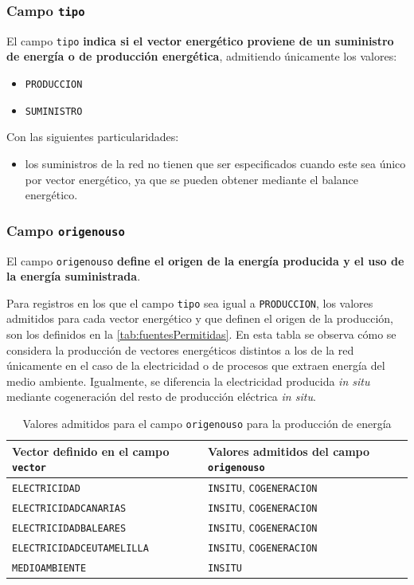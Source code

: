 \documentclass[10pt,notitlepage,oneside,a4paper]{article}
\begin{document}
\subsubsection{Campo \texttt{tipo}}

El campo \texttt{tipo} \textbf{indica si el vector energético proviene de un suministro de energía o de producción energética}, admitiendo únicamente los valores:

\begin{itemize}
\item \texttt{PRODUCCION}
\item \texttt{SUMINISTRO}
\end{itemize}

Con las siguientes particularidades:

\begin{itemize}
\item los suministros de la red no tienen que ser especificados cuando este sea único por vector energético, ya que se pueden obtener mediante el balance energético.
\end{itemize}

\subsubsection{Campo \texttt{origenouso}}

El campo \texttt{origenouso} \textbf{define el origen de la energía producida y el uso de la energía suministrada}.

Para registros en los que el campo \texttt{tipo} sea igual a \texttt{PRODUCCION}, los valores admitidos para cada vector energético y que definen el origen de la producción, son los definidos en la \autoref{tab:fuentesPermitidas}. En esta tabla se observa cómo se considera la producción de vectores energéticos distintos a los de la red únicamente en el caso de la electricidad o de procesos que extraen energía del medio ambiente. Igualmente, se diferencia la electricidad producida \textit{in situ} mediante cogeneración del resto de producción eléctrica \textit{in situ}.

\begin{table}[H]
\centering
\small
\caption{Valores admitidos para el campo \texttt{origenouso} para la producción de energía}\label{tab:fuentesPermitidas}
\begin{tabular}{ll}
    \toprule
    \textbf{Vector definido en el campo \texttt{vector}} & \textbf{Valores admitidos del campo \texttt{origenouso}}\\
    \midrule
    \texttt{ELECTRICIDAD}             & \texttt{INSITU}, \texttt{COGENERACION}\\
    \texttt{ELECTRICIDADCANARIAS}     & \texttt{INSITU}, \texttt{COGENERACION}\\
    \texttt{ELECTRICIDADBALEARES}     & \texttt{INSITU}, \texttt{COGENERACION}\\
    \texttt{ELECTRICIDADCEUTAMELILLA} & \texttt{INSITU}, \texttt{COGENERACION}\\
    \texttt{MEDIOAMBIENTE}            & \texttt{INSITU}\\
    \bottomrule
\end{tabular}
\end{table}
\end{document}

